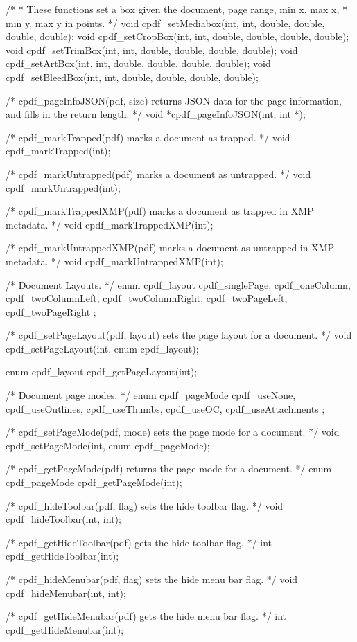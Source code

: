 /*
 * These functions set a box given the document, page range, min x, max x,
 * min y, max y in points.
 */
void cpdf_setMediabox(int, int, double, double, double, double);
void cpdf_setCropBox(int, int, double, double, double, double);
void cpdf_setTrimBox(int, int, double, double, double, double);
void cpdf_setArtBox(int, int, double, double, double, double);
void cpdf_setBleedBox(int, int, double, double, double, double);

/* cpdf_pageInfoJSON(pdf, size) returns JSON data for the page
information, and fills in the return length. */
void *cpdf_pageInfoJSON(int, int *);

/* cpdf_markTrapped(pdf) marks a document as trapped. */
void cpdf_markTrapped(int);

/* cpdf_markUntrapped(pdf) marks a document as untrapped. */
void cpdf_markUntrapped(int);

/* cpdf_markTrappedXMP(pdf) marks a document as trapped in XMP metadata. */
void cpdf_markTrappedXMP(int);

/* cpdf_markUntrappedXMP(pdf) marks a document as untrapped in XMP metadata. */
void cpdf_markUntrappedXMP(int);

/* Document Layouts. */
enum cpdf_layout {
  cpdf_singlePage,
  cpdf_oneColumn,
  cpdf_twoColumnLeft,
  cpdf_twoColumnRight,
  cpdf_twoPageLeft,
  cpdf_twoPageRight
};

/* cpdf_setPageLayout(pdf, layout) sets the page layout for a document. */
void cpdf_setPageLayout(int, enum cpdf_layout);

enum cpdf_layout cpdf_getPageLayout(int);

/* Document page modes. */
enum cpdf_pageMode {
  cpdf_useNone,
  cpdf_useOutlines,
  cpdf_useThumbs,
  cpdf_useOC,
  cpdf_useAttachments
};

/* cpdf_setPageMode(pdf, mode) sets the page mode for a document. */
void cpdf_setPageMode(int, enum cpdf_pageMode);

/* cpdf_getPageMode(pdf) returns the page mode for a document. */
enum cpdf_pageMode cpdf_getPageMode(int);

/* cpdf_hideToolbar(pdf, flag) sets the hide toolbar flag. */
void cpdf_hideToolbar(int, int);

/* cpdf_getHideToolbar(pdf) gets the hide toolbar flag. */
int cpdf_getHideToolbar(int);

/* cpdf_hideMenubar(pdf, flag) sets the hide menu bar flag. */
void cpdf_hideMenubar(int, int);

/* cpdf_getHideMenubar(pdf) gets the hide menu bar flag. */
int cpdf_getHideMenubar(int);

